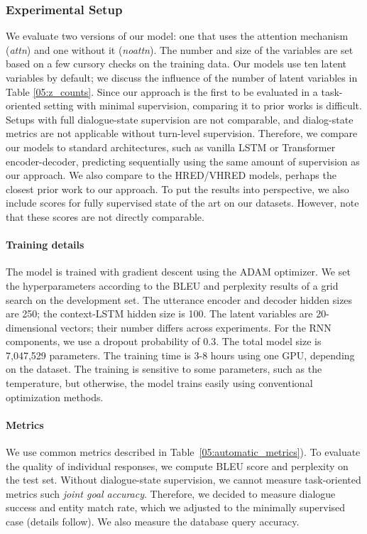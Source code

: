 \subsubsection{Experimental Setup}
\label{05:sec:expe_setup}
We evaluate two versions of our model: one that uses the attention mechanism (\emph{attn}) and one without it (\emph{noattn}). The number and size of the variables are set based on a few cursory checks on the training data. Our models use ten latent variables by default; we discuss the influence of the number of latent variables in Table \ref{05:z_counts}.
Since our approach is the first to be evaluated in a task-oriented setting with minimal supervision, comparing it to prior works is difficult. Setups with full dialogue-state supervision are not comparable, and dialog-state metrics are not applicable without turn-level supervision. Therefore, we compare our models to standard architectures, such as vanilla LSTM or Transformer encoder-decoder, predicting sequentially using the same amount of supervision as our approach. We also compare to the HRED/VHRED models, perhaps the closest prior work to our approach. To put the results into perspective, we also include scores for fully supervised state of the art on our datasets.
However, note that these scores are not directly comparable.

\paragraph{Training details}
The model is trained with gradient descent using the ADAM optimizer.
We set the hyperparameters according to the BLEU and perplexity results of a grid search on the development set.
The utterance encoder and decoder hidden sizes are 250; the context-LSTM hidden size is 100.
The latent variables are 20-dimensional vectors; their number differs across experiments.
For the RNN components, we use a dropout probability of $0.3$.
The total model size is 7,047,529 parameters.
The training time is 3-8 hours using one GPU, depending on the dataset.
The training is sensitive to some parameters, such as the  temperature, but otherwise, the model trains easily using conventional optimization methods.

\paragraph{Metrics}
We use common metrics described in Table~\ref{05:automatic_metrics}).
To evaluate the quality of individual responses, we compute BLEU score and perplexity on the test set.
Without dialogue-state supervision, we cannot measure task-oriented metrics such \emph{joint goal accuracy}.
Therefore, we decided to measure dialogue success and entity match rate, which we adjusted to the minimally supervised case (details follow).
We also measure the database query accuracy.


